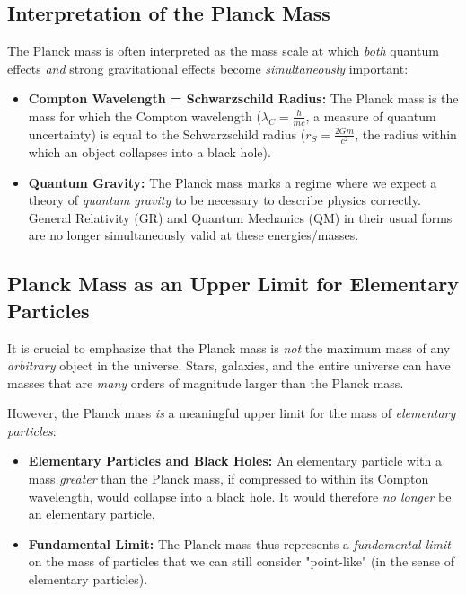 \documentclass{article}
\begin{document}
\subsection{Interpretation of the Planck Mass}

The Planck mass is often interpreted as the mass scale at which \textit{both} quantum effects \textit{and} strong gravitational effects become \textit{simultaneously} important:
\begin{itemize}
	\item \textbf{Compton Wavelength = Schwarzschild Radius:} The Planck mass is the mass for which the Compton wavelength (\(\lambda_C = \frac{h}{mc}\), a measure of quantum uncertainty) is equal to the Schwarzschild radius (\(r_S = \frac{2Gm}{c^2}\), the radius within which an object collapses into a black hole).
	\item \textbf{Quantum Gravity:} The Planck mass marks a regime where we expect a theory of \textit{quantum gravity} to be necessary to describe physics correctly. General Relativity (GR) and Quantum Mechanics (QM) in their usual forms are no longer simultaneously valid at these energies/masses.
\end{itemize}

\subsection{Planck Mass as an Upper Limit for Elementary Particles}

It is crucial to emphasize that the Planck mass is \textit{not} the maximum mass of any \textit{arbitrary} object in the universe. Stars, galaxies, and the entire universe can have masses that are \textit{many} orders of magnitude larger than the Planck mass.

However, the Planck mass \textit{is} a meaningful upper limit for the mass of \textit{elementary particles}:
\begin{itemize}
	\item \textbf{Elementary Particles and Black Holes:} An elementary particle with a mass \textit{greater} than the Planck mass, if compressed to within its Compton wavelength, would collapse into a black hole. It would therefore \textit{no longer} be an elementary particle.
	\item \textbf{Fundamental Limit:} The Planck mass thus represents a \textit{fundamental limit} on the mass of particles that we can still consider "point-like" (in the sense of elementary particles).
\end{itemize}
\end{document}
